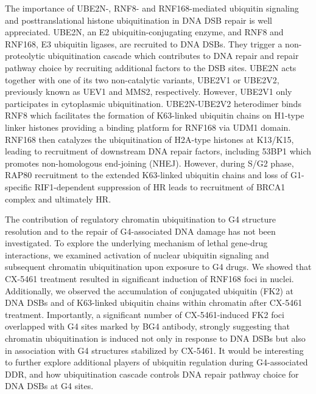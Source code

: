 The importance of UBE2N-, RNF8- and RNF168-mediated ubiquitin signaling and posttranslational histone ubiquitination in DNA DSB repair is well appreciated.  UBE2N, an E2 ubiquitin-conjugating enzyme, and RNF8 and RNF168, E3 ubiquitin ligases, are recruited to DNA DSBs\cite{Kolas2007,Mailand2007,Huen2008,Stewart2009}. 
They trigger a non-proteolytic ubiquitination cascade which contributes to DNA repair and repair pathway choice by recruiting additional factors to the DSB sites. UBE2N acts together with one of its two non-catalytic variants, UBE2V1 or UBE2V2, previously known as UEV1 and MMS2, respectively\cite{Hofmann1999a,Hodge2016c}. 
However, UBE2V1 only participates in cytoplasmic ubiquitination. UBE2N-UBE2V2 heterodimer binds RNF8 which facilitates the formation of K63-linked ubiquitin chains on H1-type linker histones providing a binding platform for RNF168 via UDM1 domain\cite{Hofmann2001,Eddins2006,Kolas2007,Campbell2012,Thorslund2015}. 
RNF168 then catalyzes the ubiquitination of H2A-type histones at K13/K15, leading to recruitment of downstream DNA repair factors, including 53BP1 which promotes non-homologous end-joining (NHEJ)\cite{Gatti2012a,Mattiroli2012,Fradet-Turcotte2013a}. 
However, during S/G2 phase, RAP80 recruitment to the extended K63-linked ubiquitin chains and loss of G1-specific RIF1-dependent suppression of HR leads to recruitment of BRCA1 complex and ultimately HR\cite{Mailand2007,Gatti2012a,Mattiroli2012}. 

The contribution of regulatory chromatin ubiquitination to G4 structure resolution and to the repair of G4-associated DNA damage has not been investigated. 
To explore the underlying mechanism of lethal gene-drug interactions, we examined activation of nuclear ubiquitin signaling and subsequent chromatin ubiquitination upon exposure to G4 drugs. 
We showed that CX-5461 treatment resulted in significant induction of RNF168 foci in nuclei. Additionally, we observed the accumulation of conjugated ubiquitin (FK2) at DNA DSBs and of K63-linked ubiquitin chains within chromatin after CX-5461 treatment. 
Importantly, a significant number of CX-5461-induced FK2 foci overlapped with G4 sites marked by BG4 antibody, strongly suggesting that chromatin ubiquitination is induced not only in response to DNA DSBs but also in association with G4 structures stabilized by CX-5461. 
It would be interesting to further explore additional players of ubiquitin regulation during G4-associated DDR, and how ubiquitination cascade controls DNA repair pathway choice for DNA DSBs at G4 sites. 

